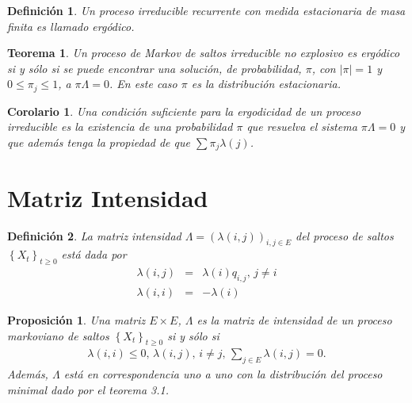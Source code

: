 \documentclass{article}
\newtheorem{Def}{Definición}[section]
\newtheorem{Teo}{Teorema}[section]
\newtheorem{Prop}{Proposición}[section]
\newtheorem{Cor}{Corolario}[section]
\numberwithin{equation}{section}
\begin{document}
\begin{Def}
Un proceso irreducible recurrente con medida estacionaria de masa
finita es llamado erg\'odico.
\end{Def}

\begin{Teo}\label{Teo.4.3}
Un proceso de Markov de saltos irreducible no explosivo es erg\'odico si y s\'olo si se puede encontrar una soluci\'on, de probabilidad, $\pi$, con $|\pi|=1$ y $0\leq\pi_{j}\leq1$, a $\pi\Lambda=0$. En este caso $\pi$ es la distribuci\'on estacionaria.
\end{Teo}

\begin{Cor}\label{Cor.4.4}
Una condici\'on suficiente para la ergodicidad de un proceso irreducible es la existencia de una probabilidad $\pi$ que resuelva el sistema $\pi\Lambda=0$ y que adem\'as tenga la propiedad de que $\sum\pi_{j}\lambda\left(j\right)$.
\end{Cor}

%
\section{Matriz Intensidad}
%


\begin{Def}
La matriz intensidad
$\Lambda=\left(\lambda\left(i,j\right)\right)_{i,j\in E}$ del proceso de saltos $\left\{X_{t}\right\}_{t\geq0}$ est\'a dada por
\begin{eqnarray*}
\lambda\left(i,j\right)&=&\lambda\left(i\right)q_{i,j}\textrm{,    }j\neq i\\
\lambda\left(i,i\right)&=&-\lambda\left(i\right)
\end{eqnarray*}
\end{Def}


\begin{Prop}\label{Prop.3.1}
Una matriz $E\times E$, $\Lambda$ es la matriz de intensidad de un proceso markoviano de saltos $\left\{X_{t}\right\}_{t\geq0}$ si y s\'olo si
\begin{eqnarray*}
\lambda\left(i,i\right)\leq0\textrm{, }\lambda\left(i,j\right)\textrm{,   }i\neq j\textrm{,  }\sum_{j\in E}\lambda\left(i,j\right)=0.
\end{eqnarray*}
Adem\'as, $\Lambda$ est\'a en correspondencia uno a uno con la
distribuci\'on del proceso minimal dado por el teorema 3.1.
\end{Prop}
\end{document}
